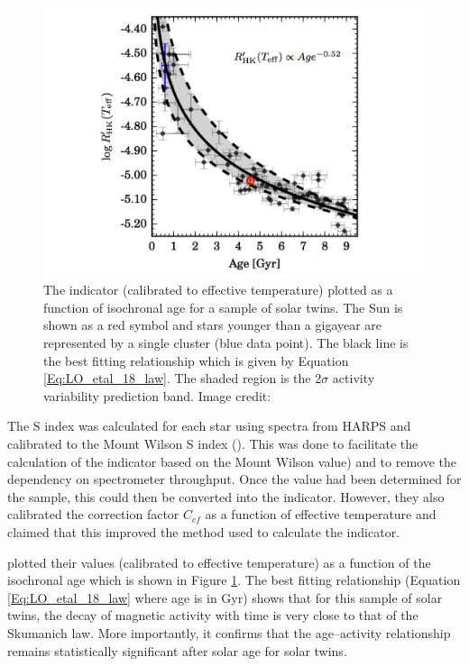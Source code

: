 \begin{figure}[h!]
    \centering
    \includegraphics[scale=0.45]{Figures/2-Historical_overview/LO_etal_18_age_activity_plot.pdf}
    \caption[\Rprime - age relationship for sample of solar twins]{The \Rprime indicator (calibrated to effective temperature) plotted as a function of isochronal age for a sample of solar twins. The Sun is shown as a red symbol and stars younger than a gigayear are represented by a single cluster (blue data point). The black line is the best fitting relationship which is given by Equation \ref{Eq:LO_etal_18_law}. The shaded region is the 2$\sigma$ activity variability prediction band. Image credit: \citet{Lorenzo_Oliveira_etal_2018}}
    \label{fig:LO_etal_18_plot}
\end{figure}

The S index was calculated for each star using spectra from HARPS and calibrated to the Mount Wilson S index (\Smw). This was done to facilitate the calculation of the \Rprime indicator based on the Mount Wilson value) and to remove the dependency on spectrometer throughput. Once the \Smw value had been determined for the sample, this could then be converted into the \Rprime indicator. However, they also calibrated the correction factor $C_{cf}$ as a function of effective temperature and claimed that this improved the method used to calculate the \Rprime indicator.

\citet{Lorenzo_Oliveira_etal_2018} plotted their \Rprime values (calibrated to effective temperature) as a function of the isochronal age which is shown in Figure \ref{fig:LO_etal_18_plot}. The best fitting relationship (Equation \ref{Eq:LO_etal_18_law} where age is in Gyr) shows that for this sample of solar twins, the decay of magnetic activity with time is very close to that of the Skumanich law. More importantly, it confirms that the age--activity relationship remains statistically significant after solar age for solar twins.

